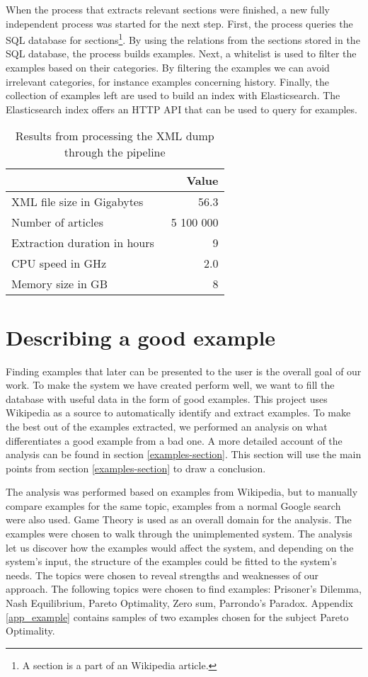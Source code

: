When the process that extracts relevant sections were finished, a new fully independent process was started for the next step. First, the process queries the SQL database for sections\footnote{A section is a part of an Wikipedia article.}. By using the relations from the sections stored in the SQL database, the process builds examples. Next, a whitelist is used to filter the examples based on their categories. By filtering the examples we can avoid irrelevant categories, for instance examples concerning history. Finally, the collection of examples left are used to build an index with Elasticsearch. The Elasticsearch index offers an HTTP API that can be used to query for examples.


\begin{table}[H]
\centering
\begin{tabular} {|| p{15em} | r ||} 
 \hline
  & Value \\ [0.5ex] 
 \hline
XML file size in Gigabytes & 56.3 \\
Number of articles & ~5 100 000 \\
Extraction duration in hours & ~9 \\
CPU speed in GHz & 2.0 \\
Memory size in GB & 8 \\

 \hline
\end{tabular}
\caption{Results from processing the XML dump through the pipeline}
\label{table:run_statistics}
\end{table}


\section{Describing a good example} \label{5:example}
Finding examples that later can be presented to the user is the overall goal of our work. To make the system we have created perform well, we want to fill the database with useful data in the form of good examples. This project uses Wikipedia as a source to automatically identify and extract examples. To make the best out of the examples extracted, we performed an analysis on what differentiates a good example from a bad one. A more detailed account of the analysis can be found in section \ref{examples-section}. This section will use the main points from section \ref{examples-section} to draw a conclusion.

The analysis was performed based on examples from Wikipedia, but to manually compare examples for the same topic, examples from a normal Google search were also used. Game Theory is used as an overall domain for the analysis. The examples were chosen to walk through the unimplemented system. The analysis let us discover how the examples would affect the system, and depending on the system's input, the structure of the examples could be fitted to the system's needs.
The topics were chosen to reveal strengths and weaknesses of our approach. The following topics were chosen to find examples: Prisoner's Dilemma, Nash Equilibrium, Pareto Optimality, Zero sum, Parrondo's Paradox. Appendix \ref{app_example} contains samples of two examples chosen for the subject Pareto Optimality. 

